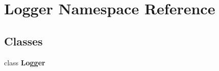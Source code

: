 \hypertarget{namespace_logger}{}\section{Logger Namespace Reference}
\label{namespace_logger}
\subsection*{Classes}
\begin{DoxyCompactItemize}
\item 
class {\bfseries Logger}
\end{DoxyCompactItemize}
